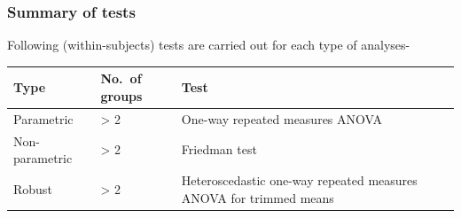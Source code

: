 \documentclass[
]{article}
\begin{document}
\hypertarget{summary-of-tests-1}{%
\subsubsection{Summary of tests}\label{summary-of-tests-1}}

Following (within-subjects) tests are carried out for each type of analyses-

\begin{longtable}[]{@{}lll@{}}
\toprule
\begin{minipage}[b]{0.26\columnwidth}\raggedright
Type\strut
\end{minipage} & \begin{minipage}[b]{0.07\columnwidth}\raggedright
No.~of groups\strut
\end{minipage} & \begin{minipage}[b]{0.59\columnwidth}\raggedright
Test\strut
\end{minipage}\tabularnewline
\midrule
\endhead
\begin{minipage}[t]{0.26\columnwidth}\raggedright
Parametric\strut
\end{minipage} & \begin{minipage}[t]{0.07\columnwidth}\raggedright
\textgreater{} 2\strut
\end{minipage} & \begin{minipage}[t]{0.59\columnwidth}\raggedright
One-way repeated measures ANOVA\strut
\end{minipage}\tabularnewline
\begin{minipage}[t]{0.26\columnwidth}\raggedright
Non-parametric\strut
\end{minipage} & \begin{minipage}[t]{0.07\columnwidth}\raggedright
\textgreater{} 2\strut
\end{minipage} & \begin{minipage}[t]{0.59\columnwidth}\raggedright
Friedman test\strut
\end{minipage}\tabularnewline
\begin{minipage}[t]{0.26\columnwidth}\raggedright
Robust\strut
\end{minipage} & \begin{minipage}[t]{0.07\columnwidth}\raggedright
\textgreater{} 2\strut
\end{minipage} & \begin{minipage}[t]{0.59\columnwidth}\raggedright
Heteroscedastic one-way repeated measures ANOVA for trimmed means\strut
\end{minipage}\tabularnewline

\end{longtable}
\end{document}
